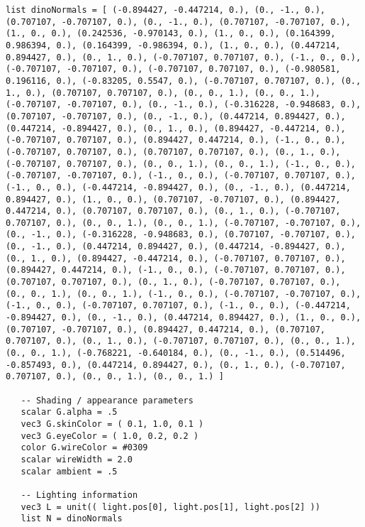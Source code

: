 \begin{lstlisting}[language=Sty-RT,escapechar=@]
   list dinoNormals = [ (-0.894427, -0.447214, 0.), (0., -1., 0.), (0.707107, -0.707107, 0.), (0., -1., 0.), (0.707107, -0.707107, 0.), (1., 0., 0.), (0.242536, -0.970143, 0.), (1., 0., 0.), (0.164399, 0.986394, 0.), (0.164399, -0.986394, 0.), (1., 0., 0.), (0.447214, 0.894427, 0.), (0., 1., 0.), (-0.707107, 0.707107, 0.), (-1., 0., 0.), (-0.707107, -0.707107, 0.), (-0.707107, 0.707107, 0.), (-0.980581, 0.196116, 0.), (-0.83205, 0.5547, 0.), (-0.707107, 0.707107, 0.), (0., 1., 0.), (0.707107, 0.707107, 0.), (0., 0., 1.), (0., 0., 1.), (-0.707107, -0.707107, 0.), (0., -1., 0.), (-0.316228, -0.948683, 0.), (0.707107, -0.707107, 0.), (0., -1., 0.), (0.447214, 0.894427, 0.), (0.447214, -0.894427, 0.), (0., 1., 0.), (0.894427, -0.447214, 0.), (-0.707107, 0.707107, 0.), (0.894427, 0.447214, 0.), (-1., 0., 0.), (-0.707107, 0.707107, 0.), (0.707107, 0.707107, 0.), (0., 1., 0.), (-0.707107, 0.707107, 0.), (0., 0., 1.), (0., 0., 1.), (-1., 0., 0.), (-0.707107, -0.707107, 0.), (-1., 0., 0.), (-0.707107, 0.707107, 0.), (-1., 0., 0.), (-0.447214, -0.894427, 0.), (0., -1., 0.), (0.447214, 0.894427, 0.), (1., 0., 0.), (0.707107, -0.707107, 0.), (0.894427, 0.447214, 0.), (0.707107, 0.707107, 0.), (0., 1., 0.), (-0.707107, 0.707107, 0.), (0., 0., 1.), (0., 0., 1.), (-0.707107, -0.707107, 0.), (0., -1., 0.), (-0.316228, -0.948683, 0.), (0.707107, -0.707107, 0.), (0., -1., 0.), (0.447214, 0.894427, 0.), (0.447214, -0.894427, 0.), (0., 1., 0.), (0.894427, -0.447214, 0.), (-0.707107, 0.707107, 0.), (0.894427, 0.447214, 0.), (-1., 0., 0.), (-0.707107, 0.707107, 0.), (0.707107, 0.707107, 0.), (0., 1., 0.), (-0.707107, 0.707107, 0.), (0., 0., 1.), (0., 0., 1.), (-1., 0., 0.), (-0.707107, -0.707107, 0.), (-1., 0., 0.), (-0.707107, 0.707107, 0.), (-1., 0., 0.), (-0.447214, -0.894427, 0.), (0., -1., 0.), (0.447214, 0.894427, 0.), (1., 0., 0.), (0.707107, -0.707107, 0.), (0.894427, 0.447214, 0.), (0.707107, 0.707107, 0.), (0., 1., 0.), (-0.707107, 0.707107, 0.), (0., 0., 1.), (0., 0., 1.), (-0.768221, -0.640184, 0.), (0., -1., 0.), (0.514496, -0.857493, 0.), (0.447214, 0.894427, 0.), (0., 1., 0.), (-0.707107, 0.707107, 0.), (0., 0., 1.), (0., 0., 1.) ]

   -- Shading / appearance parameters
   scalar G.alpha = .5
   vec3 G.skinColor = ( 0.1, 1.0, 0.1 )
   vec3 G.eyeColor = ( 1.0, 0.2, 0.2 )
   color G.wireColor = #0309
   scalar wireWidth = 2.0
   scalar ambient = .5

   -- Lighting information
   vec3 L = unit(( light.pos[0], light.pos[1], light.pos[2] ))
   list N = dinoNormals


\end{lstlisting}
